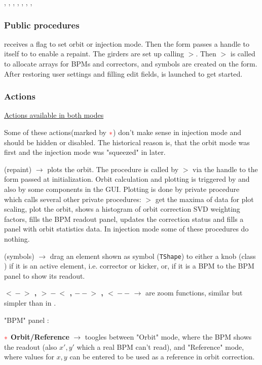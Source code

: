 \documentclass[12pt]{article}
\newcommand{\redast}{{\color{red}\ast}}
\newcommand\code[1]{{\tt #1}}
\newcommand{\ofld}[1]{\colorbox{black!15}{{{\color{black}\bf #1}}}}
\newcommand{\ofldx}[1]{\colorbox{black!15}{{\color{black}(#1)}}}
\newcommand\guico[1]{{\color{blue}\code{#1}}}
\newcommand{\unico}[1]{{\color{burntorange}\code{#1}}}
\newcommand{\evcod}[2]{\ofld{#1} $\rightarrow$ \guico{#2}}
\newcommand{\evcodx}[2]{\ofldx{#1} $\rightarrow$ \guico{#2}}
\newcommand{\prcod}[2]{\opauni{#1}$>$\unico{#2}}
\newcommand{\opagui}[1]{\colorbox{blue!20}{{\color{black}\code{#1}}}}
\newcommand{\ogui}[1]{\hyperref[#1]{\opagui{#1}}}
\newcommand{\opaguif}[1]{\colorbox{violet!30}{{\color{black}\code{#1}}}}
\newcommand{\oguif}[1]{\hyperref[#1]{\opaguif{#1}}}
\newcommand{\opauni}[1]{\colorbox{orange!30}{{\color{black}\code{#1}}}}
\newcommand{\ouni}[1]{\hyperref[#1]{\opauni{#1}}}
\newcommand{\uses}[1]{\flushleft {\bf Uses:} #1}
\newcommand{\act}[1]{\subsubsection*{Actions} #1}
\newcommand{\ppro}[1]{\subsubsection*{Public procedures} #1}
\newcommand{\todo}[1]{{\color{red} #1}}
\begin{document}
\uses{\ouni{globlib}, \ouni{georblib},
\oguif{knobframe},  \ouni{linoplib}, \ogui{ostartmenu}, \ouni{mathlib}, \oguif{comfigureframe}, \ouni{comauxlib}
}

\ppro{
\guico{Start} receives a flag to set orbit or injection mode. Then the form passes a handle to itself to \ogui{linoplib} to enable a repaint. The girders are set up calling \prcod{georblib}{GirderSetup}. Then \prcod{georblib}{OrbitInit} is called to allocate arrays for BPMs and correctors, and symbols are created on the form. After restoring user settings and filling edit fields, \ogui{ostartmenu} is launched to get started.
}

\act{}

\underline{Actions available in both modes}

\todo{Some of these actions(marked by $\redast$) don't make sense in injection mode and should be hidden or disabled. The historical reason is, that the orbit mode was first and the injection mode was "squeezed" in later.}

\evcodx{repaint}{FormPaint} plots the orbit. The procedure is called by \prcod{linoplib}{PlotOrbit} via the handle to the form passed at initialization. Orbit calculation and plotting is triggered by  \ogui{ostartmenu} and also by some components in the GUI. Plotting is done by private procedure \guico{Makeplot} which calls several other private procedures: \prcod{georblib}{Get(Orbit,Cor,Mis)Max} get the maxima of data for plot scaling, \guico{plot(X,Y)} plot the orbit, \guico{WeightPlot} shows a histogram of orbit correction SVD weighting factors, \guico{BPMshow} fills the BPM readout panel,  \guico{LabelShow} updates the correction status and \guico{CodStat} fills a panel with orbit statistics data. In injection mode some of these procedures do nothing.

\evcodx{symbols}{BoxMouse(Down, Up)} drag an element shown as symbol (\code{TShape}) to either a knob (class \oguif{knobframe}) if it is an active element, i.e. corrector or kicker, or, if it is a BPM to the BPM panel \guico{panbpm} to show its readout.

\evcod{$<\!\!-\!\!>$ , $>\!\!-\!\!<$ , $--\!\!>$ , $<\!\!--$}{butzooClick} are zoom functions, similar but simpler than in \ogui{opalinop}.

"BPM" panel \guico{panbpm}:

$\redast$ \evcod{Orbit/Reference}{butBPMmpodeClick} toogles between "Orbit" mode, where the BPM shows the readout (also $x',y'$ which a real BPM can't read), and "Reference" mode, where values for $x, y$ can be entered to be used as a reference in orbit correction.
\end{document}
